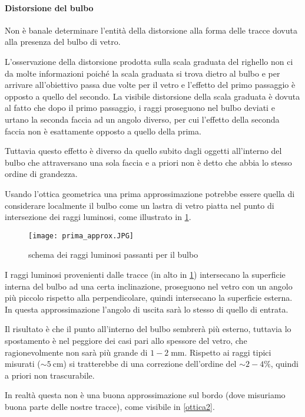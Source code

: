 \paragraph{Distorsione del bulbo} Non è banale determinare l'entità della distorsione alla forma delle tracce dovuta alla presenza del bulbo di vetro.

L'osservazione della distorsione prodotta sulla scala graduata del righello non ci da molte informazioni poiché la scala graduata si trova dietro al bulbo e per arrivare all'obiettivo passa due volte per il vetro e l'effetto del primo passaggio è opposto a quello del secondo. La visibile distorsione della scala graduata è dovuta al fatto che dopo il primo passaggio, i raggi proseguono  nel bulbo deviati e urtano la seconda faccia ad un angolo diverso, per cui l'effetto della seconda faccia non è esattamente opposto a quello della prima.

Tuttavia questo effetto è diverso da quello subito dagli oggetti all'interno del bulbo che attraversano una sola faccia e a priori non è detto che abbia lo stesso ordine di grandezza.

Usando l'ottica geometrica una prima approssimazione potrebbe essere quella di considerare localmente il bulbo come un lastra di vetro piatta nel punto di intersezione dei raggi luminosi, come illustrato in \figurename{ \ref{ottica1}}.

\begin{figure}[H]
	\centering
	\texttt{[image: prima\_approx.JPG]}
	\caption{schema dei raggi luminosi passanti per il bulbo}
	\label{ottica1}
\end{figure}

I raggi luminosi provenienti dalle tracce (in alto in \figurename{ \ref{ottica1}}) intersecano la superficie interna del bulbo ad una certa inclinazione, proseguono nel vetro con un angolo più piccolo rispetto alla perpendicolare, quindi intersecano la superficie esterna. In questa approssimazione l'angolo di uscita sarà lo stesso di quello di entrata.

Il risultato è che il punto all'interno del bulbo sembrerà più esterno, tuttavia lo spostamento è nel peggiore dei casi pari allo spessore del vetro, che ragionevolmente non sarà più grande di $1-2 \;\text{mm}$. Rispetto ai raggi tipici misurati ($\sim \SI{5}{\cm}$) si tratterebbe di una correzione dell'ordine del $\sim 2-4\%$, quindi a priori non trascurabile.

In realtà questa non è una buona approssimazione sul bordo (dove misuriamo buona parte delle nostre tracce), come visibile in \figurename{ \ref{ottica2}}.

